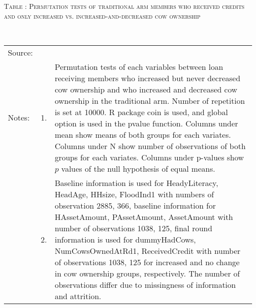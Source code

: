 \hspace{-1cm}\begin{minipage}[t]{14cm}
\hfil\textsc{\normalsize Table \thetable: Permutation tests of \textsf{traditional} arm members who received credits and only increased vs. increased-and-decreased cow ownership\label{tab permutation trad cow 2}}\\
\setlength{\tabcolsep}{1pt}
\setlength{\baselineskip}{8pt}
\renewcommand{\arraystretch}{.55}
\hfil{}\\
\renewcommand{\arraystretch}{.8}
\setlength{\tabcolsep}{1pt}
\begin{tabular}{>{\hfill\scriptsize}p{1cm}<{}>{\hfill\scriptsize}p{.25cm}<{}>{\scriptsize}p{12cm}<{\hfill}}
Source:& \multicolumn{2}{l}{\scriptsize Estimated with GUK administrative and survey data.}\\
Notes: & 1. & Permutation tests of each variables between loan receiving members who increased but never decreased cow ownership and who increased and decreased cow ownership in the \textsf{traditional} arm. Number of repetition is set at 10000. \textsf{R} package \textsf{coin} is used, and \textsf{global} option is used in the \textsf{pvalue} function. Columns under \textsf{mean} show means of both groups for each variates. Columns under \textsf{N} show number of observations of both groups for each variates. Columns under \textsf{p-values} show $p$ values of the null hypothesis of equal means. \\
& 2. & Baseline information is used for \textsf{HeadyLiteracy, HeadAge, HHsize, FloodInd1} with numbers of observation 2885, 366, baseline information for \textsf{HAssetAmount, PAssetAmount, AssetAmount} with number of observations 1038, 125, final round information is used for \textsf{dummyHadCows, NumCowsOwnedAtRd1, ReceivedCredit} with number of observations 1038, 125 for increased and no change in cow ownership groups, respectively. The number of observations differ due to missingness of information and attrition.
\end{tabular}
\end{minipage}


